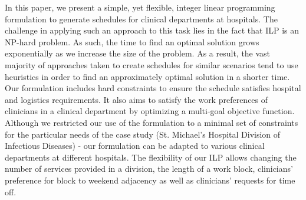 In this paper, we present a simple, yet flexible, integer linear programming formulation to generate schedules for clinical departments at hospitals. 
The challenge in applying such an approach to this task lies in the fact that ILP is an NP-hard problem. %
As such, the time to find an optimal solution grows exponentially as we increase the size of the problem. As a result, the vast majority of approaches taken to create schedules for similar scenarios tend to use heuristics in order to find an approximately optimal solution in a shorter time. \\  %


Our formulation includes hard constraints to ensure the schedule satisfies hospital and logistics requirements. It also aims to satisfy the work preferences of clinicians in a clinical department by optimizing a multi-goal objective function. Although we restricted our use of the formulation to a minimal set of constraints for the particular needs of the case study (St. Michael's Hospital Division of Infectious Diseases) - our formulation can be adapted to various clinical departments at different hospitals. The flexibility of our ILP allows changing the number of services provided in a division, the length of a work block, clinicians' preference for block to weekend adjacency as well as clinicians' requests for time off. \\

